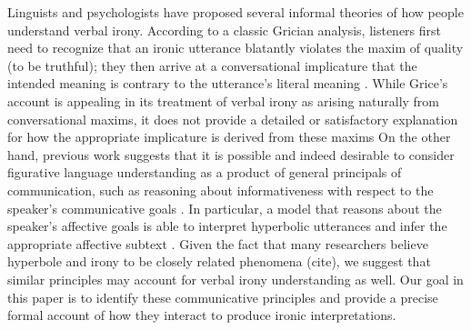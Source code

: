 \documentclass[10pt,letterpaper]{article}
\begin{document}

Linguists and psychologists have proposed several informal theories of how people understand verbal irony. According to a classic Grician analysis, listeners first need to recognize that an ironic utterance blatantly violates the maxim of quality (to be truthful); they then arrive at a conversational implicature that the intended meaning is contrary to the utterance's literal meaning \cite{grice20134, wilson2006pragmatics}. While Grice's account is appealing in its treatment of verbal irony as arising naturally from conversational maxims, it does not provide a detailed or satisfactory explanation for how the appropriate implicature is derived from these maxims \cite{wilson2006pragmatics} 
On the other hand, previous work suggests that it is possible and indeed desirable to consider figurative language understanding as a product of general principals of communication, such as reasoning about informativeness with respect to the speaker's communicative goals \cite{kao2014nonliteral, kao2014formalizing}. In particular, a model that reasons about the speaker's affective goals is able to interpret hyperbolic utterances and infer the appropriate affective subtext \cite{kao2014nonliteral}. Given the fact that many researchers believe hyperbole and irony to be closely related phenomena (cite), we suggest that similar principles may account for verbal irony understanding as well. Our goal in this paper is to identify these communicative principles and provide a precise formal account of how they interact to produce ironic interpretations.
\end{document}
